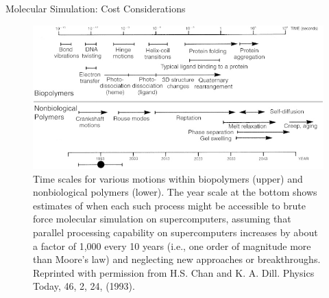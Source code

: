 \begin{section}{Molecular Simulation: Cost Considerations}
\begin{figure}
\centering
\includegraphics[width=\textwidth]{intro/simulation_timeline.png}
\caption{
Time scales for various motions within biopolymers (upper) and nonbiological
polymers (lower). The year scale at the bottom shows estimates of when each
such process might be accessible to brute force molecular simulation on
supercomputers, assuming that parallel processing capability on supercomputers
increases by about a factor of 1,000 every 10 years (i.e., one order of
magnitude more than Moore's law) and neglecting new approaches or
breakthroughs. Reprinted with permission from H.S. Chan and K. A. Dill.
Physics Today, 46, 2, 24, (1993).
\cite{Chan1993}
    }
\label{fig:intro-timeline}
\end{figure}



\end{section}


